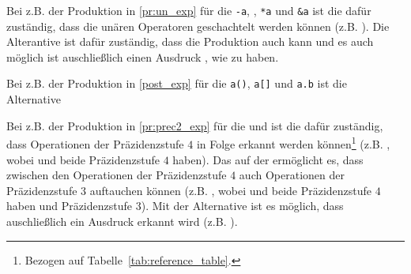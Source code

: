 Bei z.B. der Produktion  in \ref{pr:un_exp} für die  \verb|-a|, , \verb|*a| und \verb|&a| ist die   dafür zuständig, dass die unären Operatoren  geschachtelt werden können (z.B. ). Die Alterantive   ist dafür zuständig, dass die Produktion auch  kann und es auch möglich ist auschließlich einen Ausdruck , wie  zu haben.

\begin{grammar}
\end{grammar}

Bei z.B. der Produktion  in \ref{post_exp} für die  \verb|a()|, \verb|a[]| und \verb|a.b| ist die Alternative

\begin{grammar}
\end{grammar}


Bei z.B. der Produktion  in \ref{pr:prec2_exp} für die   und  ist die   dafür zuständig, dass  Operationen der Präzidenzstufe $4$ in Folge erkannt werden können\footnote{Bezogen auf Tabelle~\ref{tab:reference_table}.} (z.B. , wobei \smalltt{-} und \smalltt{+} beide Präzidenzstufe $4$ haben). Das   auf der  ermöglicht es, dass zwischen den Operationen der Präzidenzstufe $4$ auch Operationen der Präzidenzstufe $3$ auftauchen können (z.B. , wobei \smalltt{-} und \smalltt{+} beide Präzidenzstufe $4$ haben und \smalltt{/} Präzidenzstufe $3$). Mit der Alternative  ist es möglich, dass auschließlich ein Ausdruck  erkannt wird (z.B. ).

\begin{grammar}
\end{grammar}

